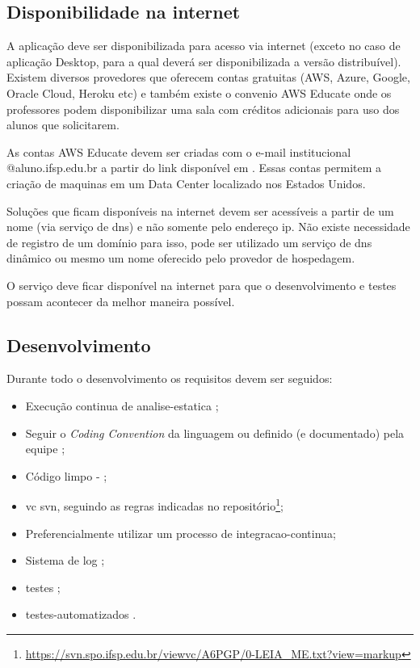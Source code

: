 

\subsection{Disponibilidade na internet}

A aplicação deve ser disponibilizada para acesso via internet (exceto no caso de aplicação Desktop, para a qual deverá ser disponibilizada a versão distribuível). Existem diversos provedores que oferecem contas gratuitas (AWS, Azure, Google, Oracle Cloud, Heroku etc) e também existe o convenio AWS Educate onde os professores podem disponibilizar uma sala com créditos adicionais para uso dos alunos que solicitarem.

As contas AWS Educate devem ser criadas com o e-mail institucional @aluno.ifsp.edu.br a partir do link disponível em . Essas contas permitem a criação de maquinas em um Data Center localizado nos Estados Unidos.

Soluções que ficam disponíveis na internet devem ser acessíveis a partir de um nome (via serviço de \ac{dns}) e não somente pelo endereço \ac{ip}. Não existe necessidade de registro de um domínio para isso, pode ser utilizado um serviço de \ac{dns} dinâmico ou mesmo um nome oferecido pelo provedor de hospedagem.

O serviço deve ficar disponível na internet para que o desenvolvimento e testes possam acontecer da melhor maneira possível.


\subsection{Desenvolvimento}

Durante todo o desenvolvimento os requisitos devem ser seguidos:

\begin{itemize}
\item Execução continua de \Gls{analise-estatica} ;

\item Seguir o \emph{Coding Convention} da linguagem ou definido (e documentado) pela equipe ;

\item Código limpo - ;

\item \Gls{vc} \gls{svn}, seguindo as regras indicadas no repositório\footnote{\url{https://svn.spo.ifsp.edu.br/viewvc/A6PGP/0-LEIA_ME.txt?view=markup}};

\item Preferencialmente utilizar um processo de \Gls{integracao-continua}; 

\item Sistema de log ;

\item \Gls{testes} ;

\item \Gls{testes-automatizados} .

\end{itemize}



